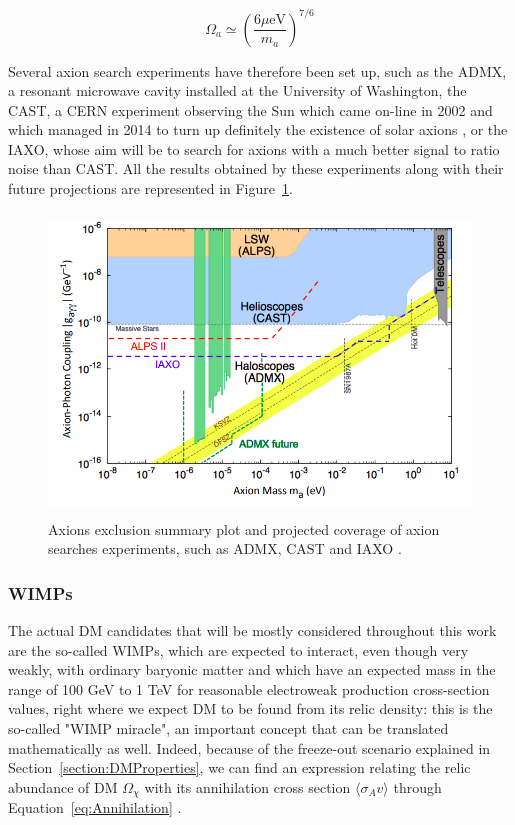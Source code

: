 \documentclass[a4paper, 10pt, openright]{report}
\begin{document}
\begin{equation}
\label{equation:AxionDensity}
\Omega_a \simeq \left ( \frac{6 \mu \text{eV}}{m_a} \right )^{7/6}
\end{equation}

Several axion search experiments have therefore been set up, such as the \ac{ADMX}, a resonant microwave cavity installed at the University of Washington, the \ac{CAST}, a CERN experiment observing the Sun which came on-line in 2002 and which managed in 2014 to turn up definitely the existence of solar axions \cite{CASTLimit}, or the \ac{IAXO}, whose aim will be to search for axions with a much better signal to ratio noise than \ac{CAST}. All the results obtained by these experiments along with their future projections are represented in Figure~\ref{figure:AxionSummary}.

\begin{figure}[htbp]
\begin{center}
\includegraphics[width=12cm, height=8cm]{figs/AxionSummary.png}
\caption{Axions exclusion summary plot and projected coverage of axion searches experiments, such as \ac{ADMX}, \ac{CAST} and \ac{IAXO} \cite{AxionSearches}.}
\label{figure:AxionSummary}
\end{center}
\end{figure}

\subsubsection*{\acfp{WIMP}} 
The actual \ac{DM} candidates that will be mostly considered throughout this work are the so-called \acp{WIMP}, which are expected to interact, even though very weakly, with ordinary baryonic matter and which have an expected mass in the range of 100 GeV to 1 TeV for reasonable electroweak production cross-section values, right where we expect \ac{DM} to be found from its relic density: this is the so-called "WIMP miracle", an important concept that can be translated mathematically as well. Indeed, because of the freeze-out scenario explained in Section~\ref{section:DMProperties}, we can find an expression relating the relic abundance of \ac{DM} $\Omega_\chi$ with its annihilation cross section $\langle \sigma_A v \rangle$ through Equation~\ref{eq:Annihilation} \cite{IndirectSearches}.
\end{document}
